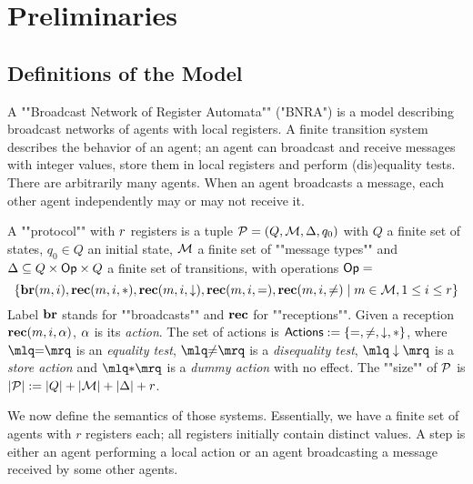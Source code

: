 \section{Preliminaries}
\label{sec:preliminaries}

\subsection{Definitions of the Model}
A ""Broadcast Network of Register Automata"" ("BNRA") \cite{DelzannoST13} is a model describing broadcast networks of agents with local registers. A finite transition system describes the behavior of an agent; an agent can broadcast and receive messages with integer values, store them in local registers and perform (dis)equality tests. 
There are arbitrarily many agents. When an agent broadcasts a message, each other agent independently may or may not receive it. 

\begin{definition}[Protocols]
	A ""protocol"" with $r$ registers is a tuple $\mathcal{P} = (Q, \mathcal{M}, \Delta, q_0)$  with $Q$ a finite set of states, $q_0 \in Q$ an initial state, $\mathcal{M}$ a finite set of ""message types""  and $\Delta \subseteq Q \times \mathsf{Op} \times Q$ a finite set of transitions, with operations $\mathsf{Op} =$
	\[
	 \{\textbf{br}(m, i), \textbf{rec}(m, i, {*}), \textbf{rec}(m, i, \downarrow), \textbf{rec}(m, i, {=}), \textbf{rec}(m, i, {\ne}) \mid m \in \mathcal{M}, 1 \leq i \leq r\}\]
	Label $\textbf{br}$ stands for ""broadcasts"" and $\textbf{rec}$ for ""receptions"".
	Given a reception $\textbf{rec}(m, i, \alpha)$, $\alpha$ is its \emph{action}. 
The set of actions is $\mathsf{Actions} := \{{=}, {\ne}, \downarrow, {*}\}$, where 
$\quotemarks{\eqtestact}$ is an \emph{equality test}, $\quotemarks{\diseqtestact}$ is a \emph{disequality test}, $\quotemarks{\enregact}$ is a \emph{store action} and $\quotemarks{\dummyact}$ is a \emph{dummy action} with no effect.
The ""size"" of $\mathcal{P}$ is $|\mathcal{P}| := |Q| + |\mathcal{M}| + |\Delta| + r$.

\end{definition}

We now define the semantics of those systems. Essentially, we have a finite set of agents with $r$ registers each; all registers initially contain distinct values. A step is either an agent performing a local action or an agent broadcasting a message received by some other agents.

